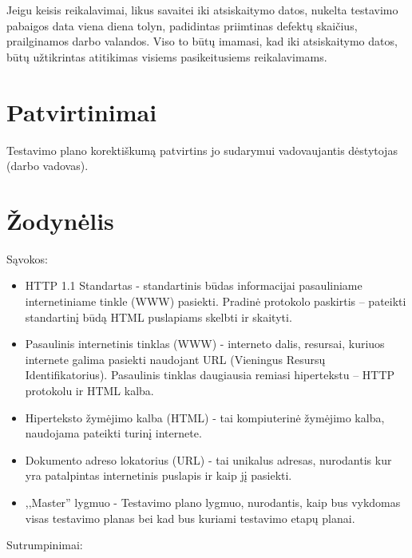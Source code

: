 Jeigu keisis reikalavimai, likus savaitei iki atsiskaitymo datos, nukelta testavimo pabaigos data viena diena tolyn, padidintas priimtinas defektų skaičius, prailginamos darbo valandos. Viso to būtų imamasi, kad iki atsiskaitymo datos, būtų užtikrintas atitikimas visiems pasikeitusiems reikalavimams.

\section{Patvirtinimai}

Testavimo plano korektiškumą patvirtins jo sudarymui vadovaujantis dėstytojas (darbo vadovas).

\section{Žodynėlis}

Sąvokos:

\begin{itemize}
	\item HTTP 1.1 Standartas - standartinis būdas informacijai pasauliniame internetiniame tinkle (WWW) pasiekti. 
		  Pradinė protokolo paskirtis – pateikti standartinį būdą HTML puslapiams skelbti ir skaityti.
	\item Pasaulinis internetinis tinklas (WWW) - interneto dalis, resursai, kuriuos internete galima pasiekti naudojant URL (Vieningus Resursų Identifikatorius).
		  Pasaulinis tinklas daugiausia remiasi hipertekstu – HTTP protokolu ir HTML kalba.
	\item Hiperteksto žymėjimo kalba (HTML) - tai kompiuterinė žymėjimo kalba, naudojama pateikti turinį internete.
	\item Dokumento adreso lokatorius (URL) - tai unikalus adresas, nurodantis kur yra patalpintas internetinis puslapis ir kaip jį pasiekti.
	\item ,,Master'' lygmuo - Testavimo plano lygmuo, nurodantis, kaip bus vykdomas visas testavimo planas bei kad bus kuriami testavimo etapų planai.
	
\end{itemize}

Sutrumpinimai:

